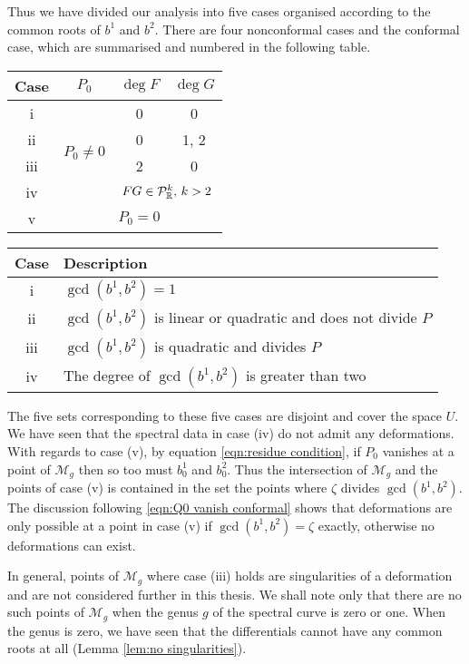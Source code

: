 Thus we have divided our analysis into five cases organised according to the common roots of $b^1$ and $b^2$. There are four nonconformal cases and the conformal case, which are summarised and numbered in the following table.
\begin{center}
\begin{tabular}{|c|c|c|c|}
\hline
Case & $P_0$ & $\deg F$ & $\deg G$ \\ \hline\hline
i & \multirow{4}{*}{$P_0 \neq 0$} & 0 & 0 \\ \cline{1-1}\cline{3-4}
ii && 0 & 1, 2 \\ \cline{1-1}\cline{3-4}
iii && 2 & 0 \\ \cline{1-1}\cline{3-4}
iv && \multicolumn{2}{|c|}{$FG \in \mathcal{P}^k_\R,\, k>2$} \\ \hline
v & \multicolumn{3}{|c|}{$P_0 = 0$} \\ \hline
\end{tabular}
\newline
\begin{tabular}{|c|l|}
\hline
Case & Description\\ \hline\hline
i & $\gcd(b^1,b^2) = 1$\\ \hline
ii & $\gcd(b^1,b^2)$ is linear or quadratic and does not divide $P$ \\ \hline
iii & $\gcd(b^1,b^2)$ is quadratic and divides $P$ \\ \hline
iv & The degree of $\gcd(b^1,b^2)$ is greater than two \\ \hline
\end{tabular}
\end{center}

The five sets corresponding to these five cases are disjoint and cover the space $U$. We have seen that the spectral data in case (iv) do not admit any deformations.
With regards to case (v), by equation \eqref{eqn:residue condition}, if $P_0$ vanishes at a point of $\mathcal{M}_g$ then so too must $b^1_0$ and $b^2_0$. Thus the intersection of $\mathcal{M}_g$ and the points of case (v) is contained in the set the points where $ζ$ divides $\gcd(b^1,b^2)$. The discussion following \eqref{eqn:Q0 vanish conformal} shows that deformations are only possible at a point in case (v) if $\gcd(b^1,b^2) = ζ$ exactly, otherwise no deformations can exist.

In general, points of $\mathcal{M}_g$ where case (iii) holds are singularities of a deformation \cite{Schmidt2016} and are not considered further in this thesis. We shall note only that there are no such points of $\mathcal{M}_g$ when the genus $g$ of the spectral curve is zero or one.
When the genus is zero, we have seen that the differentials cannot have any common roots at all (Lemma \ref{lem:no singularities}).

